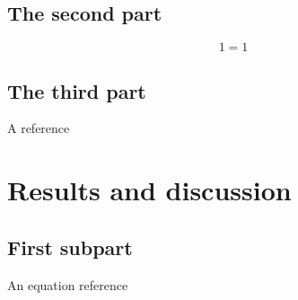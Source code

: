 \documentclass[%
 reprint,
 nobalancelastpage,
 amsmath,amssymb,
 aps,
]{revtex4-1}
\begin{document}
\subsection{\label{sec:Sec}The second part}

\begin{equation}\label{eq:22} %
	1 = 1
\end{equation}

\subsection{\label{sec:Thi}The third part}
A reference %



\section{Results and discussion}

\subsection{\label{sec:Sub1}First subpart}
An equation reference %

\end{document}
